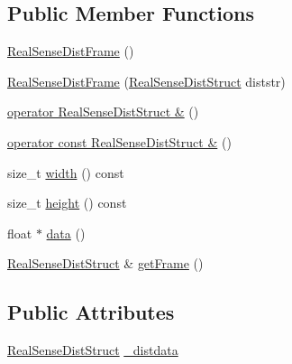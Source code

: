 \subsection*{Public Member Functions}
\begin{DoxyCompactItemize}
\item 
\hyperlink{classsofa_1_1rgbdtracking_1_1_real_sense_dist_frame_a3d49568e24334c3381cc363987bcf459}{Real\+Sense\+Dist\+Frame} ()
\item 
\hyperlink{classsofa_1_1rgbdtracking_1_1_real_sense_dist_frame_ae2a25fc1045c2dd511e7ccdaa2ad0f04}{Real\+Sense\+Dist\+Frame} (\hyperlink{structsofa_1_1rgbdtracking_1_1_real_sense_dist_frame_1_1_real_sense_dist_struct}{Real\+Sense\+Dist\+Struct} diststr)
\item 
\hyperlink{classsofa_1_1rgbdtracking_1_1_real_sense_dist_frame_a6bea0bb06a130b94dc9066c60a22a4e1}{operator Real\+Sense\+Dist\+Struct \&} ()
\item 
\hyperlink{classsofa_1_1rgbdtracking_1_1_real_sense_dist_frame_adf4c6fd68dd4a70e21bdb90b7ee9e562}{operator const Real\+Sense\+Dist\+Struct \&} ()
\item 
size\+\_\+t \hyperlink{classsofa_1_1rgbdtracking_1_1_real_sense_dist_frame_a95d9d7721c43df3754b482467062dfe9}{width} () const
\item 
size\+\_\+t \hyperlink{classsofa_1_1rgbdtracking_1_1_real_sense_dist_frame_ac2ced1d45e4ad6845d78550b196bbab1}{height} () const
\item 
float $\ast$ \hyperlink{classsofa_1_1rgbdtracking_1_1_real_sense_dist_frame_a0b624e4794f1dc10b49c90b99748cf89}{data} ()
\item 
\hyperlink{structsofa_1_1rgbdtracking_1_1_real_sense_dist_frame_1_1_real_sense_dist_struct}{Real\+Sense\+Dist\+Struct} \& \hyperlink{classsofa_1_1rgbdtracking_1_1_real_sense_dist_frame_aaab7f670c0ce70e409c298922d9d5afe}{get\+Frame} ()
\end{DoxyCompactItemize}
\subsection*{Public Attributes}
\begin{DoxyCompactItemize}
\item 
\hyperlink{structsofa_1_1rgbdtracking_1_1_real_sense_dist_frame_1_1_real_sense_dist_struct}{Real\+Sense\+Dist\+Struct} \hyperlink{classsofa_1_1rgbdtracking_1_1_real_sense_dist_frame_a95575d91b20d0cdc8cb9a9ba3795f928}{\+\_\+distdata}
\end{DoxyCompactItemize}

